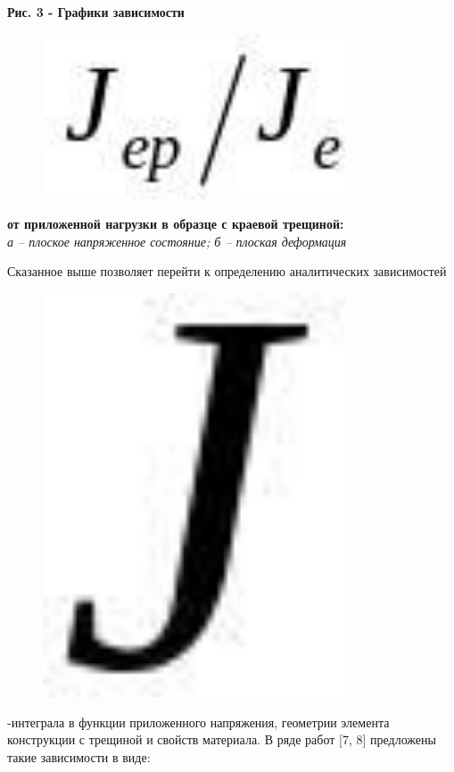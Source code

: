 {\bfseries Рис. 3 - Графики зависимости}
\begin{figure}[H]
	\centering
	\includegraphics[width=0.8\textwidth]{assets/1151}
	\caption*{}
\end{figure} {\bfseries от приложенной нагрузки в
образце с краевой трещиной:}\\
\emph{а -- плоское напряженное состояние; б -- плоская деформация}

Сказанное выше позволяет перейти к определению аналитических
зависимостей \begin{figure}[H]
	\centering
	\includegraphics[width=0.8\textwidth]{assets/1152}
	\caption*{}
\end{figure}-интеграла в функции
приложенного напряжения, геометрии элемента конструкции с трещиной и
свойств материала. В ряде работ {[}7, 8{]} предложены такие зависимости
в виде:

